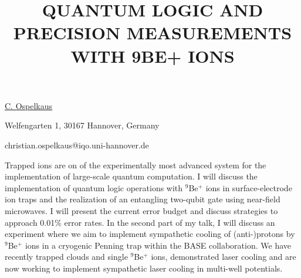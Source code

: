 \title{QUANTUM LOGIC AND PRECISION MEASUREMENTS WITH 9BE+ IONS}

\underline{C. Ospelkaus}  

{\normalsize{\vspace{-4mm}
Welfengarten 1,
30167 Hannover,
Germany



\email christian.ospelkaus@iqo.uni-hannover.de}}

Trapped ions are on of the experimentally most advanced system for the implementation of large-scale quantum computation. I will discuss the implementation of quantum logic operations with $^9$Be$^+$ ions in surface-electrode ion traps and the realization of an entangling two-qubit gate using near-field microwaves. I will present the current error budget and discuss strategies to approach 0.01\% error rates. In the second part of my talk, I will discuss an experiment where we aim to implement sympathetic cooling of (anti-)protons by $^9$Be$^+$ ions in a cryogenic Penning trap within the BASE collaboration. We have recently trapped clouds and single $^9$Be$^+$ ions, demonstrated laser cooling and are now working to implement sympathetic laser cooling in multi-well potentials. 

\vspace{\baselineskip}